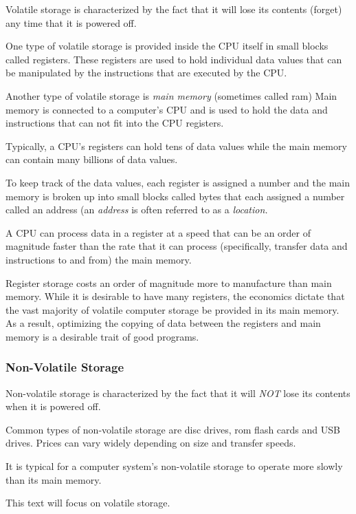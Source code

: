 Volatile storage is characterized by the fact that it will lose its
contents (forget) any time that it is powered off.

One type of volatile storage is provided inside the CPU itself in
small blocks called \glspl{register}.  These registers are used to
hold individual data values that can be manipulated by the instructions
that are executed by the CPU.

Another type of volatile storage is {\em main memory}
(sometimes called \acrshort{ram})
Main memory is connected to a computer's CPU and is used to hold
the data and instructions that can not fit into the CPU registers.

Typically, a CPU's registers can hold tens of data values while
the main memory can contain many billions of data values.

To keep track of the data values, each register is assigned a number and
the main memory is broken up into small blocks called \gls{byte}s that
each assigned a number called an \gls{address}
(an {\em address} is often referred to as a {\em location.}

A CPU can process data in a register at a speed that can be an order
of magnitude faster than the rate that it can process (specifically,
transfer data and instructions to and from) the main memory.

Register storage costs an order of magnitude more to manufacture than
main memory.  While it is desirable to have many registers, the economics
dictate that the vast majority of volatile computer storage be provided
in its main memory.  As a result, optimizing the copying of data between
the registers and main memory is a desirable trait of good programs.

\subsubsection{Non-Volatile Storage}

Non-volatile storage is characterized by the fact that it will {\em NOT}
lose its contents when it is powered off.

Common types of non-volatile storage are disc drives,
\acrshort{rom} flash cards and USB
drives.  Prices can vary widely depending on size and transfer speeds.

It is typical for a computer system's non-volatile storage to operate
more slowly than its main memory.

This text will focus on volatile storage.


